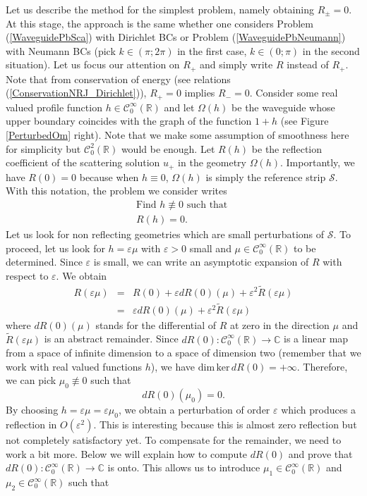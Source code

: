 \documentclass[11pt,a4paper]{report}
\newcommand{\eps}{\varepsilon}
\newcommand{\Om}{\Omega}
\newcommand{\mrm}[1]{\mathrm{#1}}
\newcommand{\Cplx}{\mathbb{C}}
\newcommand{\R}{\mathbb{R}}
\renewcommand{\ker}{\mrm{ker}}
\renewcommand{\dim}{\mrm{dim}}
\begin{document}
Let us describe the method for the simplest problem, namely obtaining $R_\pm=0$. At this stage, the approach is the same whether one considers Problem (\ref{WaveguidePbSca}) with Dirichlet BCs or Problem (\ref{WaveguidePbNeumann}) with Neumann BCs (pick $k\in(\pi;2\pi)$  in the first case, $k\in(0;\pi)$ in the second situation). 
Let us focus our attention on $R_+$ and simply write $R$ instead of $R_+$. Note that from conservation of energy (see relations (\ref{ConservationNRJ_Dirichlet})), $R_+=0$ implies $R_-=0$. Consider some real valued profile function $h\in\mathscr{C}^{\infty}_0(\R)$ and let $\Om(h)$ be the waveguide whose upper boundary coincides with the graph of the function $1+h$ (see Figure \ref{PerturbedOm} right). Note that we make some assumption of smoothness here for simplicity but $\mathscr{C}^{2}_0(\R)$ would be enough. Let $R(h)$ be the reflection coefficient of the scattering solution $u_+$ in the geometry $\Om(h)$. Importantly, we have $R(0)=0$ because when $h\equiv0$, $\Om(h)$ is simply the reference strip $\mathcal{S}$. With this notation, the problem we consider writes
\[
\begin{array}{|l}
\mbox{Find }h\not\equiv0 \mbox{ such that }\\[2pt]
R(h)=0.
\end{array}
\]
Let us look for non reflecting geometries which are small perturbations of $\mathcal{S}$. To proceed, let us look for $h=\eps \mu$ with $\eps>0$ small and $\mu\in\mathscr{C}^{\infty}_0(\R)$ to be determined. Since $\eps$ is small, we can write an asymptotic expansion of $R$ with respect to $\eps$. We obtain
\begin{equation}\label{TaylorR}
\begin{array}{rcl}
R(\eps\mu)&=&R(0)+\eps dR(0)(\mu)+\eps^2 \tilde{R}(\eps\mu)\\[3pt]
&=& \eps dR(0)(\mu)+\eps^2 \tilde{R}(\eps\mu)
\end{array}
\end{equation}
where $dR(0)(\mu)$ stands for the differential of $R$ at zero in the direction $\mu$ and $\tilde{R}(\eps\mu)$ is an abstract remainder. Since $dR(0):\mathscr{C}^\infty_0(\R)\to\Cplx$ is a linear map from a space of infinite dimension to a space of dimension two (remember that we work with real valued functions $h$), we have $\dim\,\ker\,dR(0)=+\infty$. Therefore, we can pick $\mu_0\not\equiv0$ such that 
\begin{equation}\label{DefBasis0}
dR(0)(\mu_0)=0.
\end{equation}
By choosing $h=\eps\mu=\eps\mu_0$, we obtain a perturbation of order $\eps$ which produces a reflection in $O(\eps^2)$. This is interesting because this is almost zero reflection but not completely satisfactory yet. To compensate for the remainder, we need to work a bit more. Below we will explain how to compute $dR(0)$ and prove that $dR(0):\mathscr{C}^\infty_0(\R)\to\Cplx$ is onto. This allows us to introduce $\mu_1\in\mathscr{C}^\infty_0(\R)$ and $\mu_2\in\mathscr{C}^\infty_0(\R)$ such that 
\end{document}
